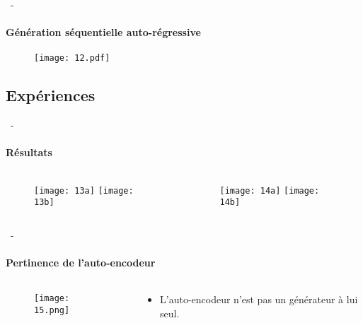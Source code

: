 \documentclass[aspectratio=169, 22pt]{beamer}
\begin{document}
\begin{frame}{\secname~- \subsecname}
  \framesubtitle{Génération séquentielle auto-régressive}
  \begin{figure}
    \texttt{[image: 12.pdf]}
  \end{figure}
\end{frame}

\subsection{Expériences}
\begin{frame}{\secname~- \subsecname}
  \framesubtitle{Résultats}
  \begin{columns}
    \begin{column}{0.5\linewidth}
      \begin{figure}
        \texttt{[image: 13a]}
        \texttt{[image: 13b]}
      \end{figure}
    \end{column}
    \begin{column}{0.5\linewidth}
      \begin{figure}
        \texttt{[image: 14a]}
        \texttt{[image: 14b]}
      \end{figure}
    \end{column}
  \end{columns}
\end{frame}

\begin{frame}{\secname~- \subsecname}
  \framesubtitle{Pertinence de l'auto-encodeur}
  \begin{columns}
    \begin{column}{0.7\linewidth}
      \begin{figure}
        \texttt{[image: 15.png]}
      \end{figure}
    \end{column}
    \begin{column}{0.3\linewidth}
      \begin{itemize}
      \item L'auto-encodeur n'est pas un générateur à lui seul.        
      \end{itemize}
    \end{column}
  \end{columns}
\end{frame}
\end{document}
